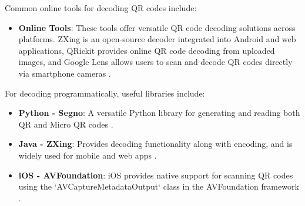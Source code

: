 Common online tools for decoding QR codes include:
\begin{itemize}
	\item \textbf{Online Tools}: These tools offer versatile QR code decoding solutions across platforms. ZXing is an open-source decoder integrated into Android and web applications, QRickit provides online QR code decoding from uploaded images, and Google Lens allows users to scan and decode QR codes directly via smartphone cameras \cite{ZXing2024, QRickit2024}.
	
\end{itemize}

For decoding programmatically, useful libraries include:
\begin{itemize}
	\item \textbf{Python - Segno}: A versatile Python library for generating and reading both QR and Micro QR codes \cite{Segno2024}.
	\item \textbf{Java - ZXing}: Provides decoding functionality along with encoding, and is widely used for mobile and web apps \cite{ZXing2024}.
	\item \textbf{iOS - AVFoundation}: iOS provides native support for scanning QR codes using the `AVCaptureMetadataOutput` class in the AVFoundation framework \cite{AVFoundation2024}.
\end{itemize}
 
